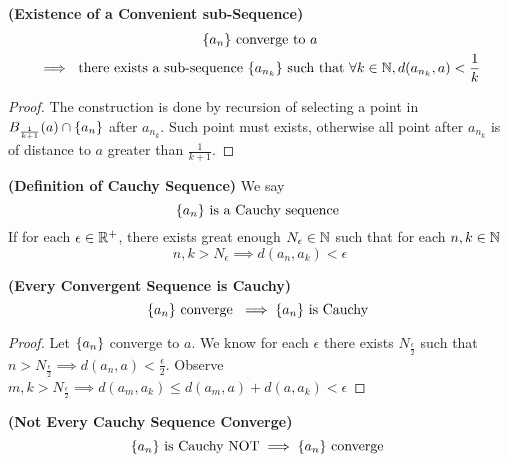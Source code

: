 \documentclass{report}
\begin{document}
\begin{theorem}
\label{3.1.9}
\textbf{(Existence of a Convenient sub-Sequence)} 
\begin{gather}
\{ a_n \}\text{ converge to }a\\
\implies  \text{ there exists a sub-sequence }\{ a_{n_k} \}  \text{ such that }\forall k\in\mathbb{N}, d(a_{n_k},a)<\frac{1}{k}
\end{gather}
\end{theorem}
\begin{proof}
The construction is done by recursion of selecting a point in $B_{\frac{1}{k+1}}(a)\cap \{ a_n \}$ after $a_{n_k}$. Such point must exists, otherwise all point after $a_{n_k}$ is of distance to $a$ greater than  $\frac{1}{k+1}$.
\end{proof}
\begin{definition}
\label{3.1.10}
\textbf{(Definition of Cauchy Sequence)} We say 
 \begin{equation}
\{ a_n \}\text{ is a Cauchy sequence }
\end{equation}
If for each $\epsilon \in\mathbb{R}^+$, there exists great enough $N_\epsilon \in\mathbb{N}$ such that for each $n,k\in\mathbb{N}$
\begin{equation}
n,k>N_\epsilon \implies d(a_n,a_k)<\epsilon 
\end{equation}
\end{definition}
\begin{theorem}
\label{3.1.11}
\textbf{(Every Convergent Sequence is Cauchy)}
\begin{equation}
\{ a_n \}\text{ converge }\implies \{ a_n \}\text{ is Cauchy }
\end{equation}
\end{theorem}
\begin{proof}
Let $\{ a_n \}$ converge to $a$. We know for each $\epsilon $ there exists $N_{\frac{\epsilon }{2} }$ such that $n>N_{\frac{\epsilon }{2}}\implies d(a_n,a)<\frac{\epsilon}{2}$. Observe $m,k>N_\frac{\epsilon }{2}\implies d(a_m,a_k)\leq d(a_m,a)+d(a,a_k)<\epsilon $
\end{proof}
\begin{theorem}
\label{3.1.12}
\textbf{(Not Every Cauchy Sequence Converge)} 
\begin{equation}
\{ a_n \}\text{ is Cauchy NOT}\implies \{ a_n \}\text{ converge }
\end{equation}
\end{theorem}
\end{document}
